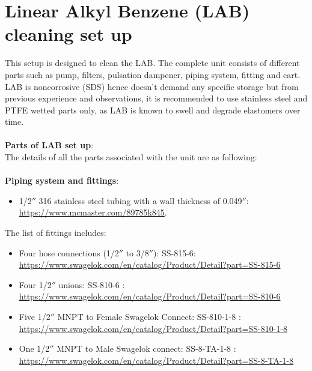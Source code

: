 \section{ Linear Alkyl Benzene (LAB) cleaning set up}
This setup is designed to clean the LAB. The complete unit consists of different parts such as pump, filters, pulsation dampener, piping system, fitting and cart.  LAB is noncorrosive (SDS) hence doesn’t demand any specific storage but from previous experience and observations, it is recommended to use stainless steel and PTFE wetted parts only, as LAB is known to swell and degrade elastomers over time. \\
\\
\textbf{Parts of LAB set up}:\\
The details of all the parts associated with the unit are as following:\\
\\
\textbf{Piping system and fittings}:\\
\begin{itemize}
\item  1/2$''$ 316 stainless steel tubing with a wall thickness of 0.049$''$: \url{https://www.mcmaster.com/89785k845}.
\end{itemize}

The list of fittings includes:\\
\begin{itemize}
\item Four hose connections (1/2$''$ to 3/8$''$): SS-815-6: \url{ https://www.swagelok.com/en/catalog/Product/Detail?part=SS-815-6}
\end{itemize}

\begin{itemize}
\item Four 1/2$''$ unions: SS-810-6 : \url{https://www.swagelok.com/en/catalog/Product/Detail?part=SS-810-6}
\end{itemize}

\begin{itemize}
\item Five 1/2$''$ MNPT to Female Swagelok Connect: SS-810-1-8 : \url{https://www.swagelok.com/en/catalog/Product/Detail?part=SS-810-1-8}
\end{itemize}

\begin{itemize}
\item One 1/2$''$  MNPT to Male Swagelok connect: SS-8-TA-1-8 : \url{https://www.swagelok.com/en/catalog/Product/Detail?part=SS-8-TA-1-8}
\end{itemize}

